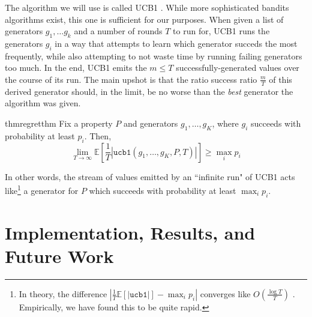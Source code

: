 \documentclass[sigconf,nonacm]{acmart}
\begin{document}
The algorithm we will use is called UCB1 \cite{auer2002finite}. While more sophisticated
bandits algorithms exist, this one is sufficient for our purposes. When given a list of generators
$g_1,\dots g_k$ and a number of rounds $T$ to run for, UCB1 runs the generators $g_i$ in a way that attempts
to learn which generator succeds the most frequently, while also attempting to not waste time by running
failing generators too much. In the end, UCB1 emits the $m \leq T$ successfully-generated values over the course of its run.
The main upshot is that the ratio success ratio $\frac{m}{T}$ of this derived generator should, in the limit,
be no worse than the \emph{best} generator the algorithm was given. 
\begin{restatable}{thm}{regretthm}
Fix a property $P$ and generators $g_1,\dots,g_K$, where $g_i$ succeeds with probability at least $p_i$. Then,
\vspace{-2px}
\[
\lim_{T \to \infty} \mathbb{E}\left[\frac{1}{T}\left|\texttt{ucb1}(g_1,\dots,g_K,P,T)\right|\right] \geq \max_i p_i
\]
\end{restatable}
In other words, the stream of values
emitted by an ``infinite run" of UCB1 acts like\footnote{In theory, the difference $\left|\frac{1}{T}\mathbb{E}\left[\left|\texttt{ucb1}\right|\right] - \max_i p_i \right|$ converges like $O\left(\frac{\log T}{T}\right)$ \cite[Theorem 1]{auer2002finite}. Empirically, we have found this to be quite rapid.} a
generator for $P$ which succeeds with probability at least $\max_i p_i$.


\section{Implementation, Results, and Future Work}
\label{sec:impl}
\end{document}
